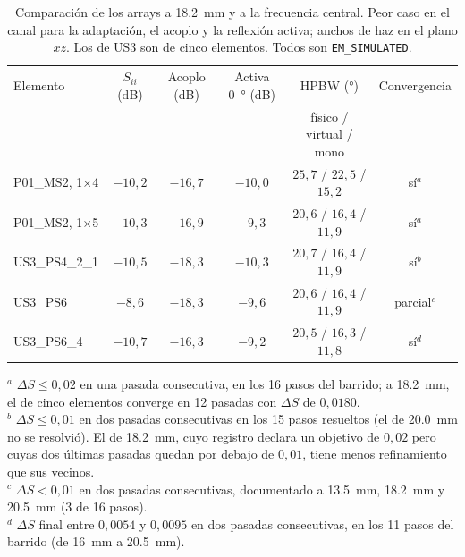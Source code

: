 \documentclass[11pt,a4paper]{article}
\begin{document}
\begin{table}[H]
    \centering
    \caption{Comparación de los arrays a \SI{18.2}{mm} y a la frecuencia central. Peor caso en el canal para la adaptación, el acoplo y la reflexión activa; anchos de haz en el plano $xz$. Los de US3 son de cinco elementos. Todos son \texttt{EM\_SIMULATED}.}
    \label{tab:arrays_182}
    {\small
    \begin{tabular}{l c c c c c}
        \toprule
        Elemento & $S_{ii}$ (\si{dB}) & Acoplo (\si{dB}) & Activa \SI{0}{\degree} (\si{dB}) & HPBW (\si{\degree}) & Convergencia \\
         & & & & físico / virtual / mono & \\
        \midrule
        P01\_MS2, 1$\times$4 & $-10{,}2$ & $-16{,}7$ & $-10{,}0$ & $25{,}7$ / $22{,}5$ / $15{,}2$ & sí$^{a}$ \\
        P01\_MS2, 1$\times$5 & $-10{,}3$ & $-16{,}9$ & $-9{,}3$ & $20{,}6$ / $16{,}4$ / $11{,}9$ & sí$^{a}$ \\
        US3\_PS4\_2\_1 & $-10{,}5$ & $-18{,}3$ & $-10{,}3$ & $20{,}7$ / $16{,}4$ / $11{,}9$ & sí$^{b}$ \\
        US3\_PS6 & $-8{,}6$ & $-18{,}3$ & $-9{,}6$ & $20{,}6$ / $16{,}4$ / $11{,}9$ & parcial$^{c}$ \\
        US3\_PS6\_4 & $-10{,}7$ & $-16{,}3$ & $-9{,}2$ & $20{,}5$ / $16{,}3$ / $11{,}8$ & sí$^{d}$ \\
        \bottomrule
    \end{tabular}
    }

    \vspace{4pt}
    \begin{minipage}{0.92\textwidth}\footnotesize
    $^{a}$ $\Delta S \le 0{,}02$ en una pasada consecutiva, en los 16 pasos del barrido; a \SI{18.2}{mm}, el de cinco elementos converge en 12 pasadas con $\Delta S$ de $0{,}0180$.\\
    $^{b}$ $\Delta S \le 0{,}01$ en dos pasadas consecutivas en los 15 pasos resueltos (el de \SI{20.0}{mm} no se resolvió). El de \SI{18.2}{mm}, cuyo registro declara un objetivo de $0{,}02$ pero cuyas dos últimas pasadas quedan por debajo de $0{,}01$, tiene menos refinamiento que sus vecinos.\\
    $^{c}$ $\Delta S < 0{,}01$ en dos pasadas consecutivas, documentado a \SI{13.5}{mm}, \SI{18.2}{mm} y \SI{20.5}{mm} (3 de 16 pasos).\\
    $^{d}$ $\Delta S$ final entre $0{,}0054$ y $0{,}0095$ en dos pasadas consecutivas, en los 11 pasos del barrido (de \SI{16}{mm} a \SI{20.5}{mm}).
    \end{minipage}
\end{table}
\end{document}
